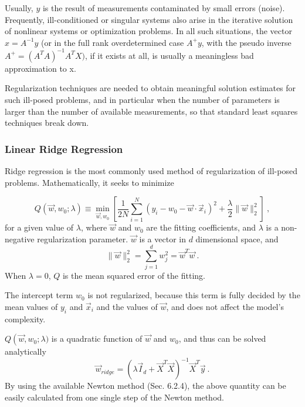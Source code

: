 Usually, $y$ is the result of measurements contaminated by small errors
(noise). Frequently, ill-conditioned or singular systems also arise in the iterative solution of nonlinear systems or optimization problems. In all such situations, the vector $x = {A}^{-1}y$ (or in the full rank overdetermined
case $A^+ y$, with the pseudo inverse $A^+ = (A^T A)^{−1}A^T X)$, if it exists at all, is usually a meaningless bad approximation to x.

Regularization techniques are needed to obtain meaningful solution estimates for
such ill-posed problems, and in particular when the number of parameters is
larger than the number of available measurements, so that standard least squares
techniques break down.




\subsubsection{Linear Ridge Regression}
Ridge regression is the most commonly used method of regularization of
ill-posed problems. Mathematically, it seeks to minimize

\begin{equation}
Q\left(\vec{w},w_0;\lambda\right)\equiv \min_{\vec{w},w_0}\left[ \frac{1}{2N} \sum_{i=1}^{N} \left( y_i - w_0 -
    \vec{w} \cdot \vec{x}_i \right)^2
  +\frac{\lambda}{2}\|\vec{w}\|_2^2 \right]\ ,
\end{equation}
for a given value of $\lambda$, where $\vec{w}$ and $w_0$ are the fitting coefficients, and $\lambda$
is a non-negative regularization parameter. $\vec{w}$ is a vector in
$d$ dimensional space, and
\begin{equation}
\|\vec{w}\|_2^2 = \sum_{j=1}^{d}w_j^2 = \vec{w}^T\vec{w}\ .
\end{equation}
When $\lambda = 0$, $Q$ is
the mean squared error of the fitting.

The intercept term $w_0$ is not regularized, because this term is
fully decided by the mean values of $y_i$ and $\vec{x}_i$ and the
values of $\vec{w}$, and does not affect the model's complexity.

$Q\left(\vec{w},w_0;\lambda)$ is a quadratic function of $\vec{w}$ and
  $w_0$, and thus can be solved analytically
\begin{equation}
\vec{w}_{ridge}=\left(\lambda\vec{I}_d +
  \vec{X}^T\vec{X}\right)^{-1}\vec{X}^T\vec{y}\ .
\end{equation}
By using the available Newton method (Sec. 6.2.4), the above quantity can be easily
calculated from one single step of the Newton method.

